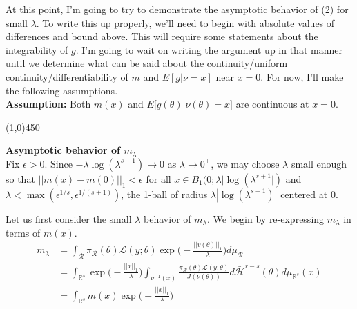 \documentclass[10pt,fleqn]{article}
\DeclareMathOperator{\1}{\mathbbm{1}}
\begin{document}
{At this point, I'm going to try to demonstrate the asymptotic behavior of (2) for small $\lambda.$ To write this up properly, we'll need to begin with absolute values of differences and bound above. This will require some statements about the integrability of $g$. I'm going to wait on writing the argument up in that manner until we determine what can be said about the continuity/uniform continuity/differentiability of $m$ and $E[g|\nu=x]$ near $x=0.$ For now, I'll make the following assumptions.\\

\noindent\textbf{Assumption:} Both $m(x)$ and $E\big[g(\theta)|\nu(\theta)=x\big]$ are continuous at $x=0.$

\begin{center}\line(1,0){450}\end{center}
\vspace{0.5cm}
\noindent \textbf{Asymptotic behavior of $m_\lambda$} \\

\noindent Fix $\epsilon >0$. Since $-\lambda\log(\lambda^{s+1}) \to 0$ as $\lambda\to 0^+$, we may choose $\lambda$ small enough so that $||m(x)-m(0)||_1 < \epsilon$ for all $x\in B_1(0;\lambda|\log(\lambda^{s+1}|)$ and $\lambda < \max(\epsilon^{1/s},\epsilon^{1/(s+1)})$, the 1-ball of radius $\lambda|\log(\lambda^{s+1})|$ centered at $0.$ 

Let us first consider the small $\lambda$ behavior of $m_\lambda.$ We begin by re-expressing $m_\lambda$ in terms of $m(x).$
\begin{align*}
m_\lambda &= \int_\mathcal{R} \pi_\mathcal{R}(\theta) \mathcal{L}(y;\theta) \exp\bigg(-\frac{||v(\theta)||_1}{\lambda}\bigg) d\mu_\mathcal{R} \\
&= \int_{\mathbb{R}^s} \exp\bigg(-\frac{||x||_1}{\lambda}\bigg) \int_{\nu^{-1}(x)} \frac{\pi_\mathcal{R}(\theta) \mathcal{L}(y;\theta)}{J(\nu(\theta))} d\bar{\mathcal{H}}^{r-s}(\theta) d\mu_{\mathbb{R}^s}(x)  \\
&=\int_{\mathbb{R}^s}m(x) \exp\bigg(-\frac{||x||_1}{\lambda}\bigg)
\end{align*}

}
\end{document}

